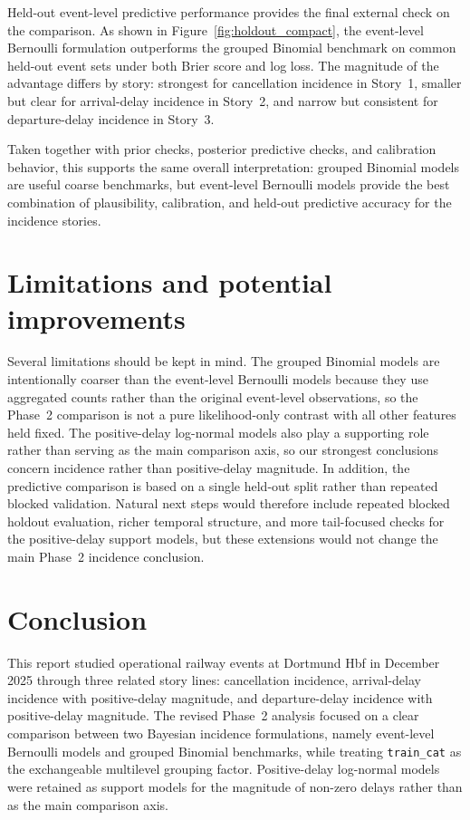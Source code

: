 \documentclass[12pt]{article}
\begin{document}
Held-out event-level predictive performance provides the final external check on the comparison. As shown in Figure~\ref{fig:holdout_compact}, the event-level Bernoulli formulation outperforms the grouped Binomial benchmark on common held-out event sets under both Brier score and log loss. The magnitude of the advantage differs by story: strongest for cancellation incidence in Story~1, smaller but clear for arrival-delay incidence in Story~2, and narrow but consistent for departure-delay incidence in Story~3.

Taken together with prior checks, posterior predictive checks, and calibration behavior, this supports the same overall interpretation: grouped Binomial models are useful coarse benchmarks, but event-level Bernoulli models provide the best combination of plausibility, calibration, and held-out predictive accuracy for the incidence stories.

\section{Limitations and potential improvements}

Several limitations should be kept in mind. The grouped Binomial models are intentionally coarser than the event-level Bernoulli models because they use aggregated counts rather than the original event-level observations, so the Phase~2 comparison is not a pure likelihood-only contrast with all other features held fixed. The positive-delay log-normal models also play a supporting role rather than serving as the main comparison axis, so our strongest conclusions concern incidence rather than positive-delay magnitude. In addition, the predictive comparison is based on a single held-out split rather than repeated blocked validation. Natural next steps would therefore include repeated blocked holdout evaluation, richer temporal structure, and more tail-focused checks for the positive-delay support models, but these extensions would not change the main Phase~2 incidence conclusion.

\section{Conclusion}

This report studied operational railway events at Dortmund Hbf in December 2025 through three related story lines: cancellation incidence, arrival-delay incidence with positive-delay magnitude, and departure-delay incidence with positive-delay magnitude. The revised Phase~2 analysis focused on a clear comparison between two Bayesian incidence formulations, namely event-level Bernoulli models and grouped Binomial benchmarks, while treating \texttt{train\_cat} as the exchangeable multilevel grouping factor. Positive-delay log-normal models were retained as support models for the magnitude of non-zero delays rather than as the main comparison axis.
\end{document}
